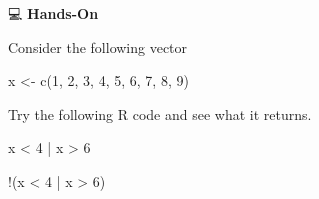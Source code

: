 \documentclass[
  letterpaper,
  DIV=11,
  numbers=noendperiod]{scrreprt}
\newenvironment{Shaded}{\begin{snugshade}}{\end{snugshade}}
\newcommand{\DecValTok}[1]{\textcolor[rgb]{0.68,0.00,0.00}{#1}}
\newcommand{\FunctionTok}[1]{\textcolor[rgb]{0.28,0.35,0.67}{#1}}
\newcommand{\NormalTok}[1]{\textcolor[rgb]{0.00,0.23,0.31}{#1}}
\newcommand{\OtherTok}[1]{\textcolor[rgb]{0.00,0.23,0.31}{#1}}
\newcommand{\SpecialCharTok}[1]{\textcolor[rgb]{0.37,0.37,0.37}{#1}}
\begin{document}
💻 \textbf{Hands-On}

Consider the following vector

\begin{Shaded}
\begin{Highlighting}[]
\NormalTok{x }\OtherTok{\textless{}{-}} \FunctionTok{c}\NormalTok{(}\DecValTok{1}\NormalTok{, }\DecValTok{2}\NormalTok{, }\DecValTok{3}\NormalTok{, }\DecValTok{4}\NormalTok{, }\DecValTok{5}\NormalTok{, }\DecValTok{6}\NormalTok{, }\DecValTok{7}\NormalTok{, }\DecValTok{8}\NormalTok{, }\DecValTok{9}\NormalTok{)}
\end{Highlighting}
\end{Shaded}

Try the following R code and see what it returns.

\begin{Shaded}
\begin{Highlighting}[]
\NormalTok{x }\SpecialCharTok{\textless{}} \DecValTok{4} \SpecialCharTok{|}\NormalTok{ x }\SpecialCharTok{\textgreater{}} \DecValTok{6}

\SpecialCharTok{!}\NormalTok{(x }\SpecialCharTok{\textless{}} \DecValTok{4} \SpecialCharTok{|}\NormalTok{ x }\SpecialCharTok{\textgreater{}} \DecValTok{6}\NormalTok{)}
\end{Highlighting}
\end{Shaded}
\end{document}

